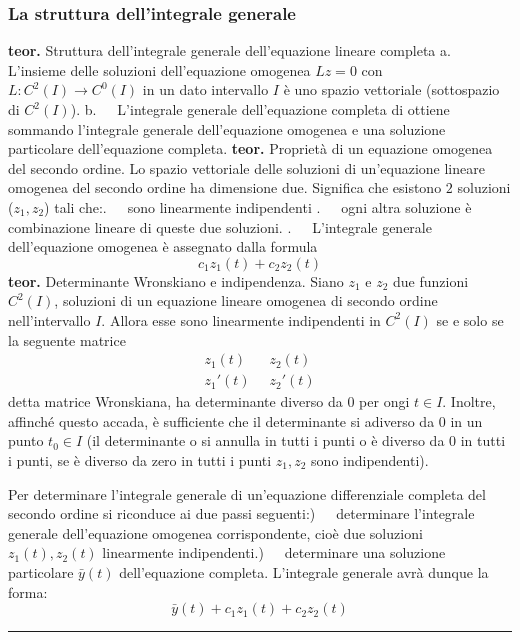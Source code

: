 \subsubsection*{La struttura dell'integrale generale}
\textbf{teor.} Struttura dell'integrale generale dell'equazione lineare completa \newline
a. $\;\;\;$ L'insieme delle soluzioni dell'equazione omogenea $Lz = 0 $ con $L:C^2(I)\rightarrow C^0(I)$ in un dato intervallo $I$ è uno spazio vettoriale (sottospazio di $C^2(I)$).\newline
b. $\;\;\;$ L'integrale generale dell'equazione completa di ottiene sommando l'integrale generale dell'equazione omogenea e una soluzione particolare dell'equazione completa.\newline
\newline
\textbf{teor.} Proprietà di un equazione omogenea del secondo ordine.\newline
Lo spazio vettoriale delle soluzioni di un'equazione lineare omogenea del secondo ordine ha dimensione due.\newline
Significa che esistono $2$ soluzioni ($z_1, z_2$) tali che:. $\;\;\;$ sono linearmente indipendenti . $\;\;\;$ ogni altra soluzione è combinazione lineare di queste due soluzioni. . $\;\;\;$ L'integrale generale dell'equazione omogenea è assegnato dalla formula
\[
    c_1 z_1(t) + c_2 z_2(t)
\]
\newline
\textbf{teor.} Determinante Wronskiano e indipendenza. \newline
Siano $z_1$ e $z_2$ due funzioni $C^2(I)$, soluzioni di un equazione lineare omogenea di secondo ordine nell'intervallo $I$. Allora esse sono linearmente indipendenti in $C^2(I)$ se e solo se la seguente matrice
\[
    \begin{matrix}
        z_1(t) \;\; & z_2(t)\\
        z_1'(t) \;\; & z_2'(t)
    \end{matrix}
\]
detta matrice Wronskiana, ha determinante diverso da $0$ per ongi $t \in I$. Inoltre, affinché questo accada, è sufficiente che il determinante si adiverso da $0$ in un punto $t_0 \in I$ (il determinante o si annulla in tutti i punti o è diverso da $0$ in tutti i punti, se è diverso da zero in tutti i punti $z_1, z_2$ sono indipendenti).
\begin{tcolorbox}
Per determinare l'integrale generale di un'equazione differenziale completa del secondo ordine si riconduce ai due passi seguenti:) $\;\;\;$ determinare l'integrale generale dell'equazione omogenea corrispondente, cioè due soluzioni $z_1(t), z_2(t)$ linearmente indipendenti.) $\;\;\;$ determinare una soluzione particolare $\bar{y}(t)$ dell'equazione completa.\newline
L'integrale generale avrà dunque la forma:
\[
    \bar{y}(t) + c_1 z_1(t) + c_2 z_2(t)
\]
\end{tcolorbox}
\rule{\textwidth}{0,4pt}
